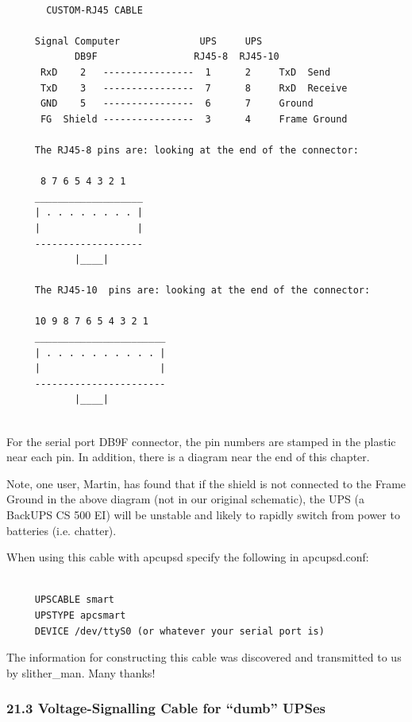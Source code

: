 \footnotesize
\begin{verbatim}
     
       CUSTOM-RJ45 CABLE
     
     Signal Computer              UPS     UPS
            DB9F                 RJ45-8  RJ45-10
      RxD    2   ----------------  1      2     TxD  Send
      TxD    3   ----------------  7      8     RxD  Receive
      GND    5   ----------------  6      7     Ground
      FG  Shield ----------------  3      4     Frame Ground
     
     The RJ45-8 pins are: looking at the end of the connector:
     
      8 7 6 5 4 3 2 1
     ___________________
     | . . . . . . . . |
     |                 |
     -------------------
            |____|
     
     The RJ45-10  pins are: looking at the end of the connector:
     
     10 9 8 7 6 5 4 3 2 1
     _______________________
     | . . . . . . . . . . |
     |                     |
     -----------------------
            |____|
     
\end{verbatim}
\normalsize

For the serial port DB9F connector, the pin numbers are stamped in the plastic
near each pin. In addition, there is a diagram near the end of this chapter.  

Note, one user, Martin, has found that if the shield is not connected to the
Frame Ground in the above diagram (not in our original schematic), the UPS (a
BackUPS CS 500 EI) will be unstable and likely to rapidly switch from power to
batteries (i.e. chatter).  

When using this cable with apcupsd specify the following in apcupsd.conf: 

\footnotesize
\begin{verbatim}
     
     UPSCABLE smart
     UPSTYPE apcsmart
     DEVICE /dev/ttyS0 (or whatever your serial port is)
\end{verbatim}
\normalsize

The information for constructing this cable was discovered and transmitted to
us by slither\_man. Many thanks! 

\label{Voltage_002dSignalling-Cable-for-_0022dumb_0022-UPSes}

\subsubsection*{21.3 Voltage-Signalling Cable for ``dumb'' UPSes}

